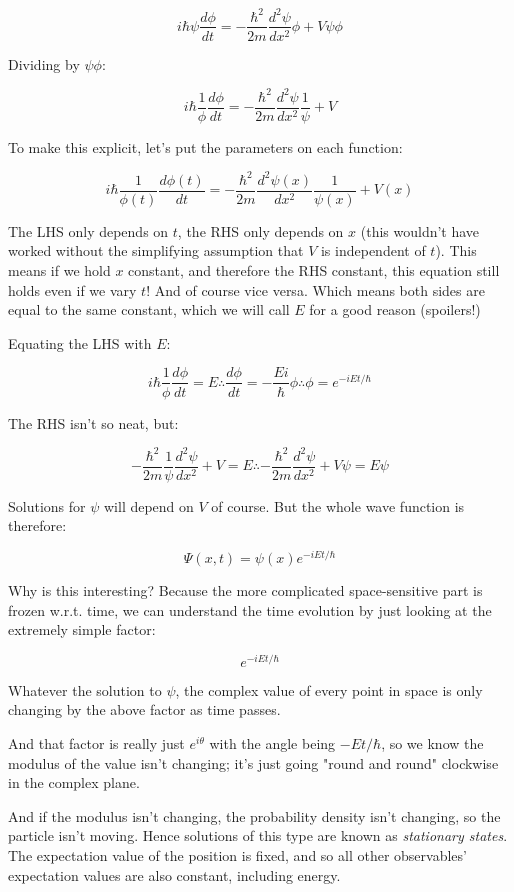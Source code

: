 $$
i\hbar
\psi \frac{d \phi}{d t}
=
- \frac{\hbar^2}{2m}
\frac{d^2 \psi}{d x^2}  \phi
+ V \psi \phi
$$

Dividing by $\psi \phi$:

$$
i\hbar
\frac{1}{\phi}
\frac{d \phi}{d t}
=
- \frac{\hbar^2}{2m}
\frac{d^2 \psi}{d x^2}
\frac{1}{\psi}
+ V
$$

To make this explicit, let's put the parameters on each function:

$$
i\hbar
\frac{1}{\phi(t)}
\frac{d \phi(t)}{d t}
=
- \frac{\hbar^2}{2m}
\frac{d^2 \psi(x)}{d x^2}
\frac{1}{\psi(x)}
+ V(x)
$$

The LHS only depends on $t$, the RHS only depends on $x$ (this wouldn't have worked without the simplifying assumption that $V$ is independent of $t$). This means if we hold $x$ constant, and therefore the RHS constant, this equation still holds even if we vary $t$! And of course vice versa. Which means both sides are equal to the same constant, which we will call $E$ for a good reason (spoilers!)

Equating the LHS with $E$:

$$
i\hbar
\frac{1}{\phi}
\frac{d \phi}{d t}
= E
\therefore
\frac{d \phi}{d t}
=
- \frac{Ei}{\hbar}
\phi
\therefore
\phi = e^{-iEt/\hbar}
$$

The RHS isn't so neat, but:

$$
- \frac{\hbar^2}{2m}
\frac{1}{\psi}
\frac{d^2 \psi}{d x^2}
+ V
=
E
\therefore
- \frac{\hbar^2}{2m}
\frac{d^2 \psi}{d x^2}
+ V\psi
=
E\psi
$$

Solutions for $\psi$ will depend on $V$ of course. But the whole wave function is therefore:

$$\Psi(x, t) = \psi(x) e^{-iEt/\hbar}$$

Why is this interesting? Because the more complicated space-sensitive part is frozen w.r.t. time, we can understand the time evolution by just looking at the extremely simple factor:

$$
e^{-iEt/\hbar}
$$

Whatever the solution to $\psi$, the complex value of every point in space is only changing by the above factor as time passes.

And that factor is really just $e^{i\theta}$ with the angle being $-Et/\hbar$, so we know the modulus of the value isn't changing; it's just going "round and round" clockwise in the complex plane.

And if the modulus isn't changing, the probability density isn't changing, so the particle isn't moving. Hence solutions of this type are known as \textit{stationary states}. The expectation value of the position is fixed, and so all other observables' expectation values are also constant, including energy.

